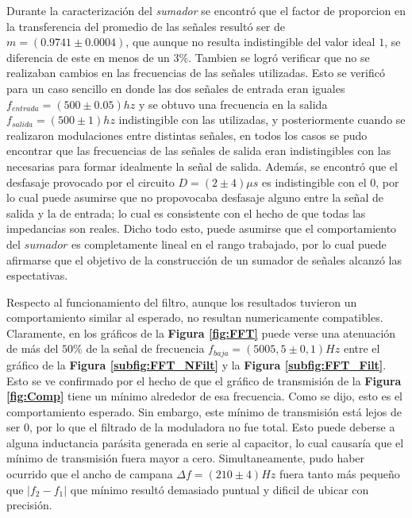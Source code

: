 \documentclass[11pt,a4paper]{article}
\begin{document}
Durante la caracterización del \textit{sumador} se encontró que el factor de proporcion en la transferencia del promedio de las señales resultó ser de $m = (0.9741 \pm 0.0004)$, que aunque no resulta indistingible del valor ideal $1$, se diferencia de este en menos de un 3\%. Tambien se logró verificar que no se realizaban cambios en las frecuencias de las señales utilizadas. Esto se verificó para un caso sencillo en donde las dos señales de entrada eran iguales $f_{entrada}= (500 \pm 0.05)hz$ y se obtuvo una frecuencia en la salida $f_{salida} = (500 \pm 1)hz$ indistingible con las utilizadas, y posteriormente cuando se realizaron modulaciones entre distintas señales, en todos los casos se pudo encontrar que las frecuencias de las señales de salida eran indistingibles con las necesarias para formar idealmente la señal de salida. Además, se encontró que el desfasaje provocado por el circuito $D= (2\pm 4) \mu s$ es indistingible con el 0, por lo cual puede asumirse que no propovocaba desfasaje alguno entre la señal de salida y la de entrada; lo cual es consistente con el hecho de que todas las impedancias son reales. Dicho todo esto, puede asumirse que el comportamiento del $sumador$ es completamente lineal en el rango trabajado, por lo cual puede afirmarse que el objetivo de la construcción de un sumador de señales alcanzó las espectativas.

Respecto al funcionamiento del filtro, aunque los resultados tuvieron un comportamiento similar al esperado, no resultan numericamente compatibles. Claramente, en los gráficos de la \textbf{Figura \ref{fig:FFT}} puede verse una atenuación de más del 
$50\%$ de la señal de frecuencia $f_{baja} = (5005,5 \pm 0,1)Hz$ entre el gráfico de la \textbf{Figura \ref{subfig:FFT_NFilt}} y la \textbf{Figura \ref{subfig:FFT_Filt}}. Esto se ve confirmado por el hecho de que el gráfico de transmisión de la \textbf{Figura \ref{fig:Comp}} tiene un mínimo alrededor de esa frecuencia. Como se dijo, esto es el comportamiento esperado. Sin embargo, este mínimo de transmisión está lejos de ser $0$, por lo que el filtrado de la moduladora no fue total. Esto puede deberse a alguna inductancia parásita generada en serie al capacitor, lo cual causaría que el mínimo de transmisión fuera mayor a cero. Simultaneamente, pudo haber ocurrido que el ancho de campana $\Delta f = (210 \pm 4)Hz$ fuera tanto más pequeño que $|f_2-f_1|$ que mínimo resultó demasiado puntual y dificil de ubicar con precisión.



\end{document}
